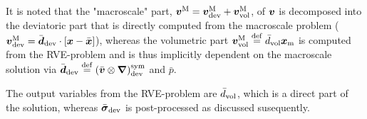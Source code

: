 \documentclass[10pt,a4paper]{article}
\newcommand{\particle}{\mathrm{part}}
\newcommand{\segment}{\mathrm{segm}}
\newcommand{\corner}{\mathrm{corn}}
\begin{document}

It is noted that the "macroscale" part, $\boldsymbol{v}^{\mathrm{M}}=\boldsymbol{v}^{\mathrm{M}}_{\mathrm{dev}}+\boldsymbol{v}^{\mathrm{M}}_{\mathrm{vol}}$, of $\boldsymbol{v}$ is decomposed into the deviatoric part that is directly computed from the macroscale problem ($\boldsymbol{v}^{\mathrm{M}}_{\mathrm{dev}}=\bar{\boldsymbol{d}}_{\mathrm{dev}}\cdot[\boldsymbol{x}-\bar{\boldsymbol{x}}]$), whereas the volumetric part $\boldsymbol{v}^{\mathrm{M}}_{\mathrm{vol}}\overset{\mathrm{def}}{=}\bar{d}_{\mathrm{vol}}\boldsymbol{x}_{\mathrm{m}}$ is computed from the RVE-problem and is thus implicitly dependent on the macroscale solution via $\bar{\boldsymbol{d}}_{\mathrm{dev}}\overset{\mathrm{def}}{=}(\bar{\boldsymbol{v}}\mathbin{\otimes}\boldsymbol{\nabla})^{\mathrm{sym}}_{\mathrm{dev}}$ and $\bar{p}$.

The output variables from the RVE-problem are $\bar{d}_{\mathrm{vol}}$, which is a direct part of the solution, whereas $\bar{\boldsymbol{\sigma}}_{\mathrm{dev}}$ is post-processed as discussed susequently.
\end{document}
